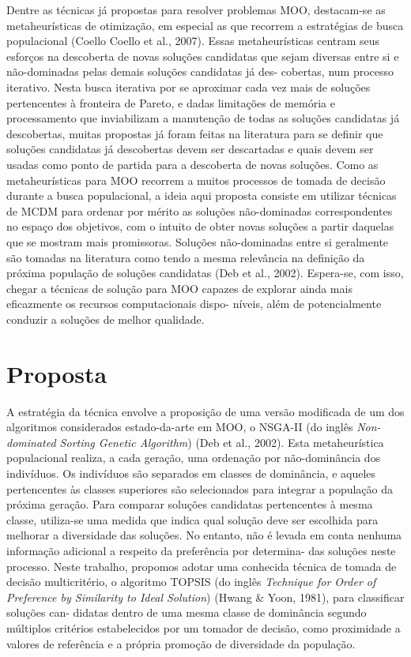 \documentclass[11pt]{article}
\begin{document}
Dentre as técnicas já propostas para resolver problemas MOO, destacam-se
as metaheurísticas de otimização, em especial as que recorrem a
estratégias de busca populacional (Coello Coello et al., 2007). Essas
metaheurísticas centram seus esforços na descoberta de novas soluções
candidatas que sejam diversas entre si e não-dominadas pelas demais
soluções candidatas já des- cobertas, num processo iterativo. Nesta
busca iterativa por se aproximar cada vez mais de soluções pertencentes
à fronteira de Pareto, e dadas limitações de memória e processamento que
inviabilizam a manutenção de todas as soluções candidatas já
descobertas, muitas propostas já foram feitas na literatura para se
definir que soluções candidatas já descobertas devem ser descartadas e
quais devem ser usadas como ponto de partida para a descoberta de novas
soluções. Como as metaheurísticas para MOO recorrem a muitos processos
de tomada de decisão durante a busca populacional, a ideia aqui proposta
consiste em utilizar técnicas de MCDM para ordenar por mérito as
soluções não-dominadas correspondentes no espaço dos objetivos, com o
intuito de obter novas soluções a partir daquelas que se mostram mais
promissoras. Soluções não-dominadas entre si geralmente são tomadas na
literatura como tendo a mesma relevância na definição da próxima
população de soluções candidatas (Deb et al., 2002). Espera-se, com
isso, chegar a técnicas de solução para MOO capazes de explorar ainda
mais eficazmente os recursos computacionais dispo- níveis, além de
potencialmente conduzir a soluções de melhor qualidade.

    \section{Proposta}\label{proposta}

A estratégia da técnica envolve a proposição de uma versão modificada de
um dos algoritmos considerados estado-da-arte em MOO, o NSGA-II (do
inglês \emph{Non-dominated Sorting Genetic Algorithm}) (Deb et al.,
2002). Esta metaheurística populacional realiza, a cada geração, uma
ordenação por não-dominância dos indivíduos. Os indivíduos são separados
em classes de dominância, e aqueles pertencentes às classes superiores
são selecionados para integrar a população da próxima geração. Para
comparar soluções candidatas pertencentes à mesma classe, utiliza-se uma
medida que indica qual solução deve ser escolhida para melhorar a
diversidade das soluções. No entanto, não é levada em conta nenhuma
informação adicional a respeito da preferência por determina- das
soluções neste processo. Neste trabalho, propomos adotar uma conhecida
técnica de tomada de decisão multicritério, o algoritmo TOPSIS (do
inglês \emph{Technique for Order of Preference by Similarity to Ideal
Solution}) (Hwang \& Yoon, 1981), para classificar soluções can- didatas
dentro de uma mesma classe de dominância segundo múltiplos critérios
estabelecidos por um tomador de decisão, como proximidade a valores de
referência e a própria promoção de diversidade da população.
\end{document}
